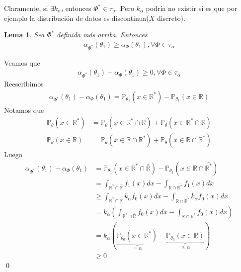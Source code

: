 \documentclass[10pt]{article}
\theoremstyle{plain}
\newtheorem{lem}{Lema}
\renewenvironment{proof}{{\bfseries \noindent Demostración}}{ \qed \\}
\theoremstyle{definition}
\begin{document}
Claramente, si $\exists k_{\alpha}$, entonces $\Phi^* \in \tau_{\alpha}$. Pero $k_{\alpha}$ podría no existir si es que por ejemplo la distribución de datos es discontinua($X$ discreto).
\begin{lem}
Sea $\Phi^*$ definida más arriba. Entonces
\begin{align*}
\alpha_{\Phi^*}(\theta_{1}) \ge \alpha_{\Phi}(\theta_{1}), \forall \Phi \in \tau_{\alpha}
\end{align*}
\end{lem}
\begin{proof}
Veamos que
\begin{align*}
\alpha_{\Phi^*}(\theta_{1}) - \alpha_{\Phi}(\theta_{1}) \ge 0, \forall \Phi \in \tau_{\alpha}
\end{align*}
Reescribimos
\begin{align*}
\alpha_{\Phi^*}(\theta_{1}) - \alpha_{\Phi}(\theta_{1}) = \mathbb{P}_{\theta_{1}}(x\in\mathbb{R}^*) -\mathbb{P}_{\theta_{1}}(x\in\mathbb{R})
\end{align*}
Notamos que 
\begin{align*}
\mathbb{P}_{\theta}(x \in \mathbb{R}^*) &= \mathbb{P}_{\theta}(x\in \mathbb{R}^* \cap \mathbb{R}) + \mathbb{P}_{\theta}(x\in \mathbb{R}^* \cap \bar{\mathbb{R}})\\
\mathbb{P}_{\theta}(x \in \mathbb{R}) &= \mathbb{P}_{\theta}(x\in \mathbb{R} \cap \mathbb{R}^*) + \mathbb{P}_{\theta}(x\in \mathbb{R} \cap \bar{\mathbb{R}^*})
\end{align*}
Luego
\begin{align*}
\alpha_{\Phi^*}(\theta_{1}) - \alpha_{\Phi}(\theta_{1}) &= \mathbb{P}_{\theta_{1}}(x\in \mathbb{R}^* \cap \bar{\mathbb{R}}) - \mathbb{P}_{\theta_{1}}(x\in \mathbb{R} \cap \bar{\mathbb{R}^*})\\
&=\int_{\mathbb{R}^* \cap \bar{\mathbb{R}}} {f_{1}(x)dx} - \int_{\mathbb{R} \cap \bar{\mathbb{R}^*}} {f_{1}(x)dx}\\
&\ge \int_{\mathbb{R}^* \cap \bar{\mathbb{R}}} {k_{\alpha}f_{0}(x)dx} - \int_{\mathbb{R} \cap \bar{\mathbb{R}^*}} {k_{\alpha}f_{0}(x)dx}\\
&= k_{\alpha}\left(\int_{\mathbb{R}^* \cap \bar{\mathbb{R}}} {f_{0}(x)dx} - \int_{\mathbb{R} \cap \bar{\mathbb{R}^*}} {f_{0}(x)dx}\right)\\
&=k_{\alpha}\left(\underbrace{\mathbb{P}_{\theta_{0}}(x\in\mathbb{R}^*)}_{=\alpha}-\underbrace{\mathbb{P}_{\theta_{0}}(x\in\mathbb{R})}_{\le \alpha}\right)\\
&\ge 0
\end{align*}
\end{proof}
\end{document}
